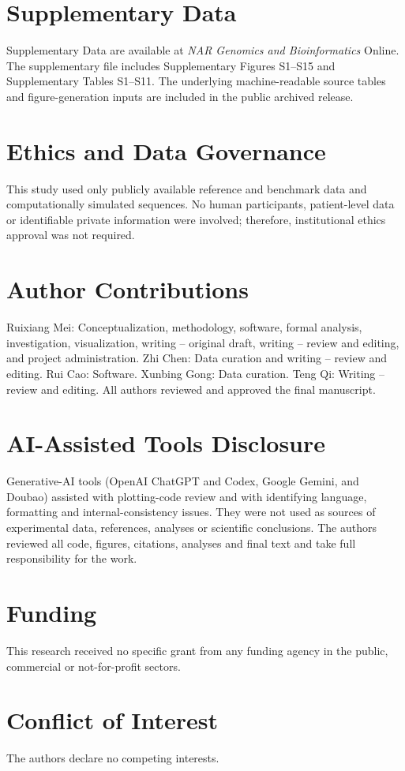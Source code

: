 \FloatBarrier
\section{Supplementary Data}

Supplementary Data are available at \textit{NAR Genomics and Bioinformatics} Online. The supplementary file includes Supplementary Figures S1--S15 and Supplementary Tables S1--S11. The underlying machine-readable source tables and figure-generation inputs are included in the public archived release.

\FloatBarrier
\section{Ethics and Data Governance}

This study used only publicly available reference and benchmark data and computationally simulated sequences. No human participants, patient-level data or identifiable private information were involved; therefore, institutional ethics approval was not required.

\FloatBarrier
\section{Author Contributions}

Ruixiang Mei: Conceptualization, methodology, software, formal analysis, investigation, visualization, writing -- original draft, writing -- review and editing, and project administration. Zhi Chen: Data curation and writing -- review and editing. Rui Cao: Software. Xunbing Gong: Data curation. Teng Qi: Writing -- review and editing. All authors reviewed and approved the final manuscript.

\FloatBarrier
\section{AI-Assisted Tools Disclosure}

Generative-AI tools (OpenAI ChatGPT and Codex, Google Gemini, and Doubao) assisted with plotting-code review and with identifying language, formatting and internal-consistency issues. They were not used as sources of experimental data, references, analyses or scientific conclusions. The authors reviewed all code, figures, citations, analyses and final text and take full responsibility for the work.

\FloatBarrier
\section{Funding}

This research received no specific grant from any funding agency in the public, commercial or not-for-profit sectors.

\FloatBarrier
\section{Conflict of Interest}

The authors declare no competing interests.
